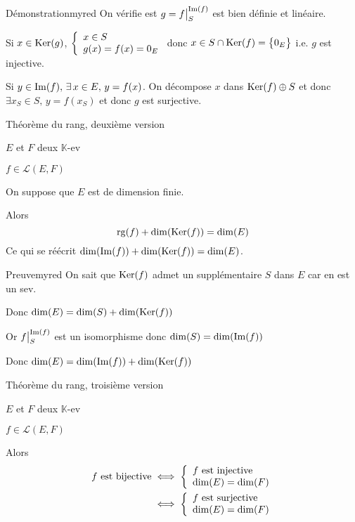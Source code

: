    \begin{demo}{Démonstration}{myred}
        On vérifie est $g = \restrcorestr{f}{S}{\Ima(f)}$ est bien définie et linéaire.
        
        Si $x \in \operatorname{Ker}(g)$, $\et{x \in S}{g(x)=f(x)=0_E}$ donc $x \in S \cap \operatorname{Ker}(f) = \big\{ 0_E \big\}$ i.e. $g$ est injective.
        
        Si $y \in \operatorname{Im}(f), \, \exists \, x \in E, \, y = f(x)$. On décompose $x$ dans $\operatorname{Ker}(f) \oplus S$ et donc $\exists x_S \in S, \, y = f(x_S)$ et donc $g$ est surjective.
    \end{demo}
    
    \begin{theo}{Théorème du rang, deuxième version}{}
        \begin{soient}
            \item $E$ et $F$ deux $\mathbb{K}$-ev
            \item $f \in \mathcal{L}(E,F)$
        \end{soient}
        On suppose que $E$ est de dimension finie.
    
        Alors \[ \operatorname{rg}(f) + \dim(\operatorname{Ker}(f)) = \dim(E) \]
        Ce qui se réécrit $\dim(\operatorname{Im}(f)) + \dim(\operatorname{Ker}(f)) = \dim(E)$.
    \end{theo}
    
    \begin{demo}{Preuve}{myred}
        On sait que $\operatorname{Ker}(f)$ admet un supplémentaire $S$ dans $E$ car en est un sev.
        
        Donc $\dim(E) = \dim(S) + \dim(\operatorname{Ker}(f))$
        
        Or $\restrcorestr{f}{S}{\Ima(f)}$ est un isomorphisme donc $\dim(S) = \dim(\operatorname{Im}(f))$ 
        
        Donc $\dim(E) = \dim(\operatorname{Im}(f)) + \dim(\operatorname{Ker}(f))$
    \end{demo}
    
    \begin{theo}{Théorème du rang, troisième version}{}
        \begin{soient}
            \item $E$ et $F$ deux $\mathbb{K}$-ev
            \item $f \in \mathcal{L}(E,F)$
        \end{soient}
        Alors \begin{align*}
            f \text{ est bijective} & \iff \et{f \text{ est injective}}{\dim(E) = \dim(F)} \\
            & \iff \et{f \text{ est surjective}}{\dim(E) = \dim(F)}
        \end{align*}
    \end{theo}
    
